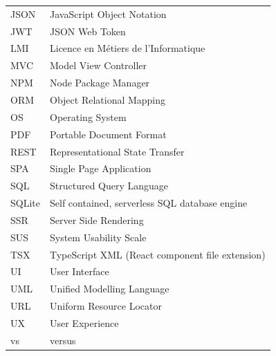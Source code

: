 \begin{longtable}{@{}p{3cm}p{12cm}@{}}
  JSON  & JavaScript Object Notation \\
  JWT   & JSON Web Token \\
  LMI   & Licence en Métiers de l'Informatique \\
  MVC   & Model View Controller \\
  NPM   & Node Package Manager \\
  ORM   & Object Relational Mapping \\
  OS    & Operating System \\
  PDF   & Portable Document Format \\
  REST  & Representational State Transfer \\
  SPA   & Single Page Application \\
  SQL   & Structured Query Language \\
  SQLite & Self contained, serverless SQL database engine \\
  SSR   & Server Side Rendering \\
  SUS   & System Usability Scale \\
  TSX   & TypeScript XML (React component file extension) \\
  UI    & User Interface \\
  UML   & Unified Modelling Language \\
  URL   & Uniform Resource Locator \\
  UX    & User Experience \\
  vs    & versus \\
  \bottomrule
\end{longtable}
